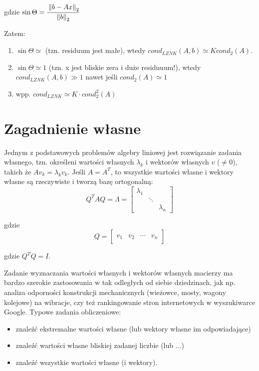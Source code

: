 \documentclass[hidelinks,a4paper,fleqn,oneside]{book}
\newcommand{\norm}[1]{\left\lVert#1\right\rVert}
\begin{document}
gdzie $\sin{\Theta} = \cfrac{\norm{b - Ax}_2}{\norm{b}_2}$

Zatem:

\begin{enumerate}
	\item $\sin\Theta \simeq$ (tzn. residuum jest małe), wtedy $cond_{LZNK}(A, b) \simeq K cond_2(A)$.
	      	
	\item $\sin\Theta \simeq 1$ (tzn. x jest bliskie zera i duże residuuum!), wtedy $cond_{LZNK}(A, b)\gg 1$ nawet jeśli $cond_2(A) \simeq 1$
	      	
	\item wpp. $cond_{LZNK} \simeq K \cdot cond_2^2(A)$
\end{enumerate}

\section{Zagadnienie własne}
Jednym z podstawowych problemów algebry liniowej jest rozwiązanie zadania własnego, tzn. określeni wartości własnych $\lambda_k$ i wektorów własnych $v$ ($\neq 0$), takich że $Av_k = \lambda_k v_k$. Jeśli $A = A^T$, to wszystkie wartości własne i wektory własne są rzeczywiste i tworzą bazę ortogonalną:
\[
	Q^TAQ = \Lambda = \left[\begin{array}{ccc}
	\lambda_1 &  & \\ 
	&  \ddots & \\ 
	&  & \lambda_n
	\end{array}\right]
\]

gdzie
\[
	Q = \left[ \begin{array}{c|c|c|c} & & & \\ v_1 & v_2 & \cdots & v_n \\ & & & \end{array} \right]
\]

gdzie $Q^TQ = I$.

Zadanie wyznaczania wartości własnych i wektorów własnych macierzy ma bardzo szerokie zastosowania w tak odległych od siebie dziedzinach, jak np. analiza odporności konstrukcji mechanicznych (wieżowce, mosty, wagony kolejowe) na wibracje, czy też rankingowanie stron internetowych w wyszukiwarce Google. Typowe zadania obliczeniowe:

\begin{itemize}
	\item znaleźć ekstremalne wartości własne (lub wektory własne im odpowiadające)
	\item znaleźć wartości własne bliskiej zadanej liczbie (lub ...)
	\item znaleźć wszystkie wartości własne (i wektory).
\end{itemize}
\end{document}
